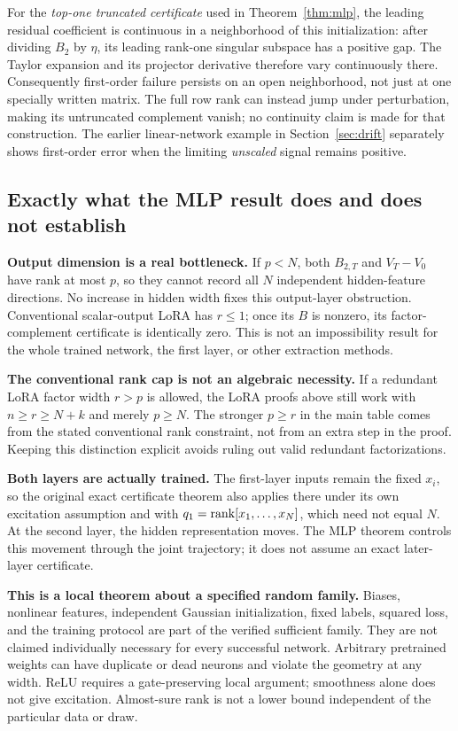\documentclass[12pt,a4paper]{article}
\theoremstyle{readable}
\theoremstyle{definition}\newtheorem{example}[theorem]{Example}
\begin{document}
For the \emph{top-one truncated certificate} used in Theorem~\ref{thm:mlp}, the leading residual coefficient is continuous in a neighborhood of this initialization: after dividing \(B_2\) by \(\eta\), its leading rank-one singular subspace has a positive gap. The Taylor expansion and its projector derivative therefore vary continuously there. Consequently first-order failure persists on an open neighborhood, not just at one specially written matrix. The full row rank can instead jump under perturbation, making its untruncated complement vanish; no continuity claim is made for that construction. The earlier linear-network example in Section~\ref{sec:drift} separately shows first-order error when the limiting \emph{unscaled} signal remains positive.

\subsection{Exactly what the MLP result does and does not establish}
\textbf{Output dimension is a real bottleneck.} If \(p<N\), both \(B_{2,T}\) and \(V_T-V_0\) have rank at most \(p\), so they cannot record all \(N\) independent hidden-feature directions. No increase in hidden width fixes this output-layer obstruction. Conventional scalar-output LoRA has \(r\le1\); once its \(B\) is nonzero, its factor-complement certificate is identically zero. This is not an impossibility result for the whole trained network, the first layer, or other extraction methods.

\textbf{The conventional rank cap is not an algebraic necessity.} If a redundant LoRA factor width \(r>p\) is allowed, the LoRA proofs above still work with \(n\ge r\ge N+k\) and merely \(p\ge N\). The stronger \(p\ge r\) in the main table comes from the stated conventional rank constraint, not from an extra step in the proof. Keeping this distinction explicit avoids ruling out valid redundant factorizations.

\textbf{Both layers are actually trained.} The first-layer inputs remain the fixed \(x_i\), so the original exact certificate theorem also applies there under its own excitation assumption and with \(q_1=\operatorname{rank}[x_1,\ldots,x_N]\), which need not equal \(N\). At the second layer, the hidden representation moves. The MLP theorem controls this movement through the joint trajectory; it does not assume an exact later-layer certificate.

\textbf{This is a local theorem about a specified random family.} Biases, nonlinear features, independent Gaussian initialization, fixed labels, squared loss, and the training protocol are part of the verified sufficient family. They are not claimed individually necessary for every successful network. Arbitrary pretrained weights can have duplicate or dead neurons and violate the geometry at any width. ReLU requires a gate-preserving local argument; smoothness alone does not give excitation. Almost-sure rank is not a lower bound independent of the particular data or draw.
\end{document}
